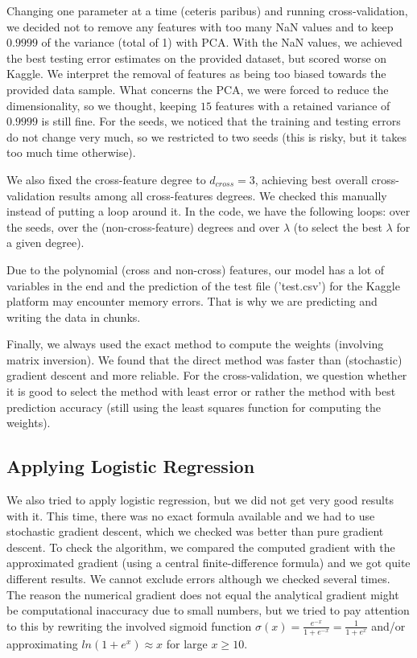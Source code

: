 \documentclass[10pt,conference,compsocconf]{IEEEtran}
\begin{document}
Changing one parameter at a time (ceteris paribus) and running cross-validation, we decided not to remove any features with too many NaN values and to keep $0.9999$ of the variance (total of 1) with PCA. With the NaN values, we achieved the best testing error estimates on the provided dataset, but scored worse on Kaggle. We interpret the removal of features as being too biased towards the provided data sample. What concerns the PCA, we were forced to reduce the dimensionality, so we thought, keeping $15$ features with a retained variance of $0.9999$ is still fine. For the seeds, we noticed that the training and testing errors do not change very much, so we restricted to two seeds (this is risky, but it takes too much time otherwise).

We also fixed the cross-feature degree to $d_{cross} = 3$, achieving best overall cross-validation results among all cross-features degrees. We checked this manually instead of putting a loop around it. In the code, we have the following loops: over the seeds, over the (non-cross-feature) degrees and over $\lambda$ (to select the best $\lambda$ for a given degree).

Due to the polynomial (cross and non-cross) features, our model has a lot of variables in the end and the prediction of the test file ('test.csv') for the Kaggle platform may encounter memory errors. That is why we are predicting and writing the data in chunks.

Finally, we always used the exact method to compute the weights (involving matrix inversion). We found that the direct method was faster than (stochastic) gradient descent and more reliable. For the cross-validation, we question whether it is good to select the method with least error or rather the method with best prediction accuracy (still using the least squares function for computing the weights).

\subsection{Applying Logistic Regression}
We also tried to apply logistic regression, but we did not get very good results with it. This time, there was no exact formula available and we had to use stochastic gradient descent, which we checked was better than pure gradient descent. To check the algorithm, we compared the computed gradient with the approximated gradient (using a central finite-difference formula) and we got quite different results. We cannot exclude errors although we checked several times. The reason the numerical gradient does not equal the analytical gradient might be computational inaccuracy due to small numbers, but we tried to pay attention to this by rewriting the involved sigmoid function $\sigma(x) = \frac{e^{-x}}{1+e^{-x}} = \frac{1}{1+e^{x}}$ and/or approximating $ln(1+e^x)\approx x$ for large $x \geq 10$.
\end{document}
